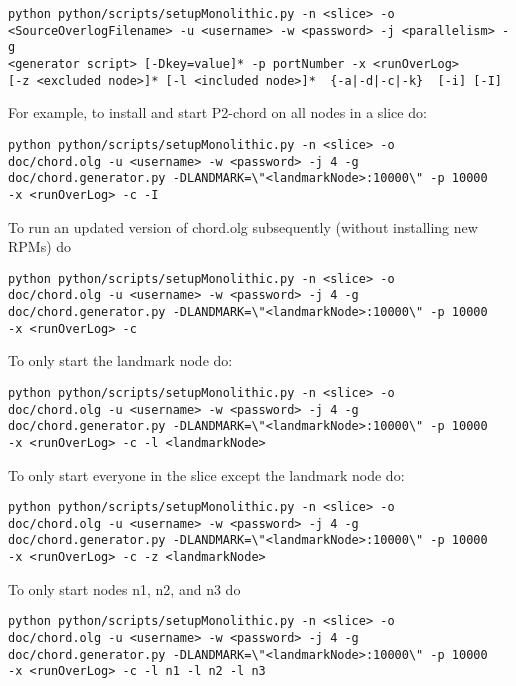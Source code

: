 \documentclass{article}
\begin{document}
\begin{itemize}
\begin{verbatim}
python python/scripts/setupMonolithic.py -n <slice> -o
<SourceOverlogFilename> -u <username> -w <password> -j <parallelism> -g
<generator script> [-Dkey=value]* -p portNumber -x <runOverLog>
[-z <excluded node>]* [-l <included node>]*  {-a|-d|-c|-k}  [-i] [-I]
\end{verbatim}

For example, to install and start P2-chord on all nodes in a slice do:

\begin{verbatim}
python python/scripts/setupMonolithic.py -n <slice> -o
doc/chord.olg -u <username> -w <password> -j 4 -g
doc/chord.generator.py -DLANDMARK=\"<landmarkNode>:10000\" -p 10000
-x <runOverLog> -c -I
\end{verbatim}

To run an updated version of chord.olg subsequently (without installing
new RPMs) do

\begin{verbatim}
python python/scripts/setupMonolithic.py -n <slice> -o
doc/chord.olg -u <username> -w <password> -j 4 -g
doc/chord.generator.py -DLANDMARK=\"<landmarkNode>:10000\" -p 10000
-x <runOverLog> -c
\end{verbatim}

To only start the landmark node do:

\begin{verbatim}
python python/scripts/setupMonolithic.py -n <slice> -o
doc/chord.olg -u <username> -w <password> -j 4 -g
doc/chord.generator.py -DLANDMARK=\"<landmarkNode>:10000\" -p 10000
-x <runOverLog> -c -l <landmarkNode>
\end{verbatim}

To only start everyone in the slice except the landmark node do:

\begin{verbatim}
python python/scripts/setupMonolithic.py -n <slice> -o
doc/chord.olg -u <username> -w <password> -j 4 -g
doc/chord.generator.py -DLANDMARK=\"<landmarkNode>:10000\" -p 10000
-x <runOverLog> -c -z <landmarkNode>
\end{verbatim}

To only start nodes n1, n2, and n3 do

\begin{verbatim}
python python/scripts/setupMonolithic.py -n <slice> -o
doc/chord.olg -u <username> -w <password> -j 4 -g
doc/chord.generator.py -DLANDMARK=\"<landmarkNode>:10000\" -p 10000
-x <runOverLog> -c -l n1 -l n2 -l n3
\end{verbatim}


\end{itemize}
\end{document}
